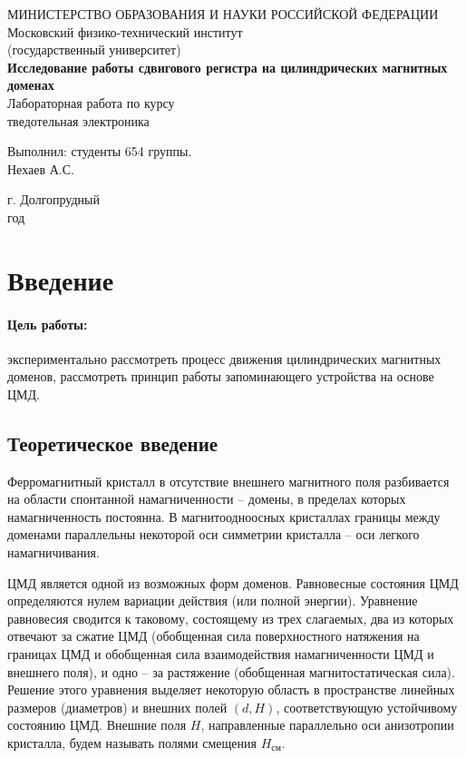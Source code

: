 \documentclass[a4paper, 12pt]{article}
\begin{document}
	\begin{titlepage}
		\begin{center}
		МИНИСТЕРСТВО ОБРАЗОВАНИЯ И НАУКИ РОССИЙСКОЙ ФЕДЕРАЦИИ\\
		\footnotesize{Московский физико-технический институт}\\
		\footnotesize{(государственный университет)}\\
		\vfill
		{\LARGE
		\textbf{Исследование работы сдвигового регистра на цилиндрических магнитных доменах}\\
		}
		\vspace{1cm}
		Лабораторная работа по курсу\\
		тведотельная электроника
		\vfill
		\begin{flushright}
			Выполнил: студенты 654 группы.\\
			Нехаев А.С.\\
		\end{flushright}
		\vfill
		г. Долгопрудный\\
		\the\year\:год
		\end{center}
	\end{titlepage}
	\newpage
	\tableofcontents
	\newpage
	\section{Введение}
	\paragraph{Цель работы:}
	экспериментально рассмотреть процесс движения цилиндрических магнитных доменов, рассмотреть принцип работы запоминающего устройства на основе ЦМД.
	\subsection{Теоретическое введение}
	Ферромагнитный кристалл в отсутствие внешнего магнитного поля разбивается на области спонтанной намагниченности -- домены, в пределах которых намагниченность постоянна. В магнитоодноосных кристаллах границы между доменами параллельны некоторой оси симметрии кристалла -- оси легкого намагничивания.

	ЦМД является одной из возможных форм доменов. Равновесные состояния ЦМД определяются нулем вариации действия (или полной энергии). Уравнение равновесия сводится к таковому, состоящему из трех слагаемых, два из которых отвечают за сжатие ЦМД (обобщенная сила поверхностного натяжения на границах ЦМД и обобщенная сила взаимодействия намагниченности ЦМД и внешнего поля), и одно – за растяжение (обобщенная магнитостатическая сила). Решение этого уравнения выделяет некоторую область в пространстве линейных размеров (диаметров) и внешних полей $(d, H)$, соответствующую устойчивому состоянию ЦМД. Внешние поля $H$, направленные параллельно оси анизотропии кристалла, будем называть полями смещения $H_{\text{см}}$.
\end{document}
